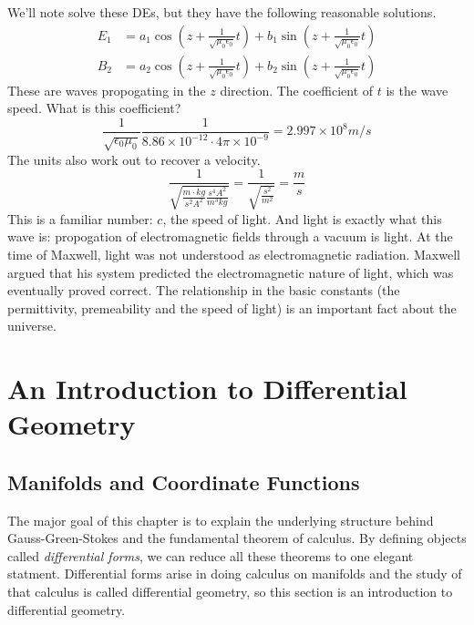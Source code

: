 \documentclass[fleqn,letterpaper]{report}
\begin{document}
We'll note solve these DEs, but they have the following
reasonable solutions.
\begin{align*}
E_1 & = a_1 \cos \left( z + \frac{1}{\sqrt{\mu_0 \epsilon_0}}t
\right) + b_1 \sin \left( z + \frac{1}{\sqrt{\mu_0
\epsilon_0}}t \right) \\
B_2 & = a_2 \cos \left( z + \frac{1}{\sqrt{\mu_0 \epsilon_0}}t
\right) + b_2 \sin \left( z + \frac{1}{\sqrt{\mu_0
\epsilon_0}}t \right) 
\end{align*}
These are waves propogating in the $z$ direction. The
coefficient of $t$ is the wave speed. What is this coefficient?
\begin{equation*}
\frac{1}{\sqrt{\epsilon_0 \mu_0}} \frac{1}{8.86\times
10^{-12} \cdot 4\pi \times 10^{-9}} = 2.997 \times 10^8 m/s
\end{equation*}
The units also work out to recover a velocity.
\begin{equation*}
\frac{1}{\sqrt{\frac{m \cdot kg}{s^2 A^2} \frac{s^4 A^2}{m^3
kg}}} = \frac{1}{\sqrt{\frac{s^2}{m^2}}} = \frac{m}{s}
\end{equation*}
This is a familiar number: $c$, the speed of light. And light
is exactly what this wave is: propogation of electromagnetic
fields through a vacuum is light. At the time of Maxwell,
light was not understood as electromagnetic radiation.
Maxwell argued that his system predicted the electromagnetic
nature of light, which was eventually proved correct. The
relationship in the basic constants (the permittivity,
premeability and the speed of light) is an important fact
about the universe. 

\chapter{An Introduction to Differential Geometry}
\label{differential-geometry}

\section{Manifolds and Coordinate Functions}
\label{manifolds}

The major goal of this chapter is to explain the underlying 
structure behind Gauss-Green-Stokes and the fundamental
theorem of calculus. By defining objects called
\emph{differential forms}, we can reduce all these theorems to
one elegant statment. Differential forms arise in doing 
calculus on manifolds and the study of that calculus is called
differential geometry, so this section is an introduction to
differential geometry. 
\end{document}
